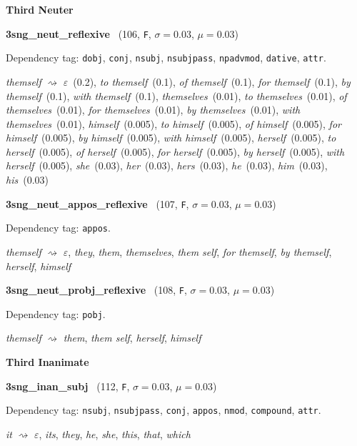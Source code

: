 \documentclass[11pt]{article}
\newenvironment{desc}{%
	\list{}{%
		\parsep 0.25em
		\topsep 0.25em
		\leftmargin 1em
		\rightmargin 0em
	}
	\item\relax
	\sloppy
}{%
	\endlist
}
\newcommand{\attr}[4]{%
	(#1, \texttt{#2}, $\sigma=#3$, $\mu=#4$)
}
\begin{document}
\noindent
\textbf{Third Neuter}

\noindent
\textbf{3sng\_neut\_reflexive}~\attr{106}{F}{0.03}{0.03}

\begin{desc}
	Dependency tag:
	\texttt{dobj},
	\texttt{conj},
	\texttt{nsubj},
	\texttt{nsubjpass},
	\texttt{npadvmod},
	\texttt{dative},
	\texttt{attr}.

	\textit{themself}
	$\rightsquigarrow$
	\textit{$\varepsilon$}~(0.2),
	\textit{to themself}~(0.1),
	\textit{of themself}~(0.1),
	\textit{for themself}~(0.1),
	\textit{by themself}~(0.1),
	\textit{with themself}~(0.1),
	\textit{themselves}~(0.01),
	\textit{to themselves}~(0.01),
	\textit{of themselves}~(0.01),
	\textit{for themselves}~(0.01),
	\textit{by themselves}~(0.01),
	\textit{with themselves}~(0.01),
	\textit{himself}~(0.005),
	\textit{to himself}~(0.005),
	\textit{of himself}~(0.005),
	\textit{for himself}~(0.005),
	\textit{by himself}~(0.005),
	\textit{with himself}~(0.005),
	\textit{herself}~(0.005),
	\textit{to herself}~(0.005),
	\textit{of herself}~(0.005),
	\textit{for herself}~(0.005),
	\textit{by herself}~(0.005),
	\textit{with herself}~(0.005),
	\textit{she}~(0.03),
	\textit{her}~(0.03),
	\textit{hers}~(0.03),
	\textit{he}~(0.03),
	\textit{him}~(0.03),
	\textit{his}~(0.03)
\end{desc}

\noindent
\textbf{3sng\_neut\_appos\_reflexive}~\attr{107}{F}{0.03}{0.03}

\begin{desc}
	Dependency tag: \texttt{appos}.

	\textit{themself}
	$\rightsquigarrow$
	\textit{$\varepsilon$},
	\textit{they},
	\textit{them},
	\textit{themselves},
	\textit{them self},
	\textit{for themself},
	\textit{by themself},
	\textit{herself},
	\textit{himself}
\end{desc}

\noindent
\textbf{3sng\_neut\_probj\_reflexive}~\attr{108}{F}{0.03}{0.03}

\begin{desc}
	Dependency tag: \texttt{pobj}.

	\textit{themself}
	$\rightsquigarrow$
	\textit{them},
	\textit{them self},
	\textit{herself},
	\textit{himself}
\end{desc}

\noindent
\textbf{Third Inanimate}

\noindent
\textbf{3sng\_inan\_subj}~\attr{112}{F}{0.03}{0.03}

\begin{desc}
	Dependency tag:
	\texttt{nsubj},
	\texttt{nsubjpass},
	\texttt{conj},
	\texttt{appos},
	\texttt{nmod},
	\texttt{compound},
	\texttt{attr}.

	\textit{it}
	$\rightsquigarrow$
	\textit{$\varepsilon$},
	\textit{its},
	\textit{they},
	\textit{he},
	\textit{she},
	\textit{this},
	\textit{that},
	\textit{which}
\end{desc}
\end{document}
